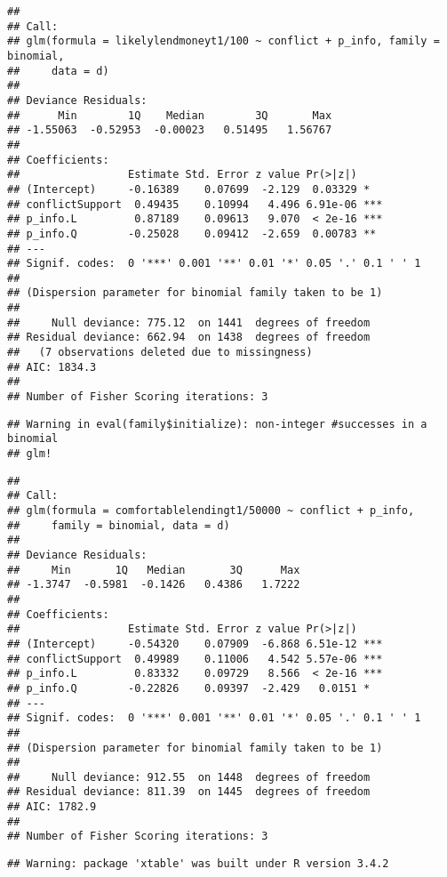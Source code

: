\documentclass[]{article}
\begin{document}
\begin{verbatim}
## 
## Call:
## glm(formula = likelylendmoneyt1/100 ~ conflict + p_info, family = binomial, 
##     data = d)
## 
## Deviance Residuals: 
##      Min        1Q    Median        3Q       Max  
## -1.55063  -0.52953  -0.00023   0.51495   1.56767  
## 
## Coefficients:
##                 Estimate Std. Error z value Pr(>|z|)    
## (Intercept)     -0.16389    0.07699  -2.129  0.03329 *  
## conflictSupport  0.49435    0.10994   4.496 6.91e-06 ***
## p_info.L         0.87189    0.09613   9.070  < 2e-16 ***
## p_info.Q        -0.25028    0.09412  -2.659  0.00783 ** 
## ---
## Signif. codes:  0 '***' 0.001 '**' 0.01 '*' 0.05 '.' 0.1 ' ' 1
## 
## (Dispersion parameter for binomial family taken to be 1)
## 
##     Null deviance: 775.12  on 1441  degrees of freedom
## Residual deviance: 662.94  on 1438  degrees of freedom
##   (7 observations deleted due to missingness)
## AIC: 1834.3
## 
## Number of Fisher Scoring iterations: 3
\end{verbatim}

\begin{verbatim}
## Warning in eval(family$initialize): non-integer #successes in a binomial
## glm!
\end{verbatim}

\begin{verbatim}
## 
## Call:
## glm(formula = comfortablelendingt1/50000 ~ conflict + p_info, 
##     family = binomial, data = d)
## 
## Deviance Residuals: 
##     Min       1Q   Median       3Q      Max  
## -1.3747  -0.5981  -0.1426   0.4386   1.7222  
## 
## Coefficients:
##                 Estimate Std. Error z value Pr(>|z|)    
## (Intercept)     -0.54320    0.07909  -6.868 6.51e-12 ***
## conflictSupport  0.49989    0.11006   4.542 5.57e-06 ***
## p_info.L         0.83332    0.09729   8.566  < 2e-16 ***
## p_info.Q        -0.22826    0.09397  -2.429   0.0151 *  
## ---
## Signif. codes:  0 '***' 0.001 '**' 0.01 '*' 0.05 '.' 0.1 ' ' 1
## 
## (Dispersion parameter for binomial family taken to be 1)
## 
##     Null deviance: 912.55  on 1448  degrees of freedom
## Residual deviance: 811.39  on 1445  degrees of freedom
## AIC: 1782.9
## 
## Number of Fisher Scoring iterations: 3
\end{verbatim}

\begin{verbatim}
## Warning: package 'xtable' was built under R version 3.4.2
\end{verbatim}
\end{document}
